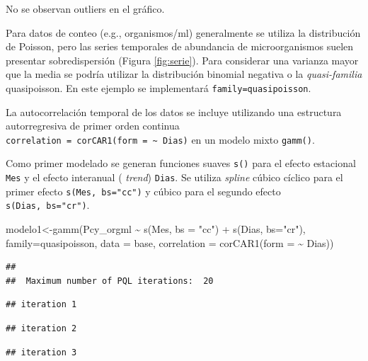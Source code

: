 \documentclass[
]{book}
\newenvironment{Shaded}{\begin{snugshade}}{\end{snugshade}}
\newcommand{\AttributeTok}[1]{\textcolor[rgb]{0.77,0.63,0.00}{#1}}
\newcommand{\FunctionTok}[1]{\textcolor[rgb]{0.00,0.00,0.00}{#1}}
\newcommand{\NormalTok}[1]{#1}
\newcommand{\OtherTok}[1]{\textcolor[rgb]{0.56,0.35,0.01}{#1}}
\newcommand{\SpecialCharTok}[1]{\textcolor[rgb]{0.00,0.00,0.00}{#1}}
\newcommand{\StringTok}[1]{\textcolor[rgb]{0.31,0.60,0.02}{#1}}
\begin{document}
No se observan outliers en el gráfico.

Para datos de conteo (e.g., organismos/ml) generalmente se utiliza la distribución de Poisson, pero las series temporales de abundancia de microorganismos suelen presentar sobredispersión (Figura \ref{fig:serie}). Para considerar una varianza mayor que la media se podría utilizar la distribución binomial negativa o la \emph{quasi-familia} quasipoisson. En este ejemplo se implementará \texttt{family=quasipoisson}.

La autocorrelación temporal de los datos se incluye utilizando una estructura autorregresiva de primer orden continua \texttt{correlation\ =\ corCAR1(form\ =\ \textasciitilde{}\ Dias)} en un modelo mixto \texttt{gamm()}.

Como primer modelado se generan funciones suaves \texttt{s()} para el efecto estacional \texttt{Mes} y el efecto interanual ( \emph{trend}) \texttt{Dias}. Se utiliza \emph{spline} cúbico cíclico para el primer efecto \texttt{s(Mes,\ bs="cc")} y cúbico para el segundo efecto \texttt{s(Dias,\ bs="cr")}.

\begin{Shaded}
\begin{Highlighting}[]
\NormalTok{modelo1}\OtherTok{\textless{}{-}}\FunctionTok{gamm}\NormalTok{(Pcy\_orgml }\SpecialCharTok{\textasciitilde{}} \FunctionTok{s}\NormalTok{(Mes, }\AttributeTok{bs =} \StringTok{"cc"}\NormalTok{) }\SpecialCharTok{+} \FunctionTok{s}\NormalTok{(Dias, }\AttributeTok{bs=}\StringTok{"cr"}\NormalTok{), }
              \AttributeTok{family=}\NormalTok{quasipoisson, }\AttributeTok{data =}\NormalTok{ base, }
              \AttributeTok{correlation =} \FunctionTok{corCAR1}\NormalTok{(}\AttributeTok{form =} \SpecialCharTok{\textasciitilde{}}\NormalTok{ Dias))}
\end{Highlighting}
\end{Shaded}

\begin{verbatim}
## 
##  Maximum number of PQL iterations:  20
\end{verbatim}

\begin{verbatim}
## iteration 1
\end{verbatim}

\begin{verbatim}
## iteration 2
\end{verbatim}

\begin{verbatim}
## iteration 3
\end{verbatim}
\end{document}
